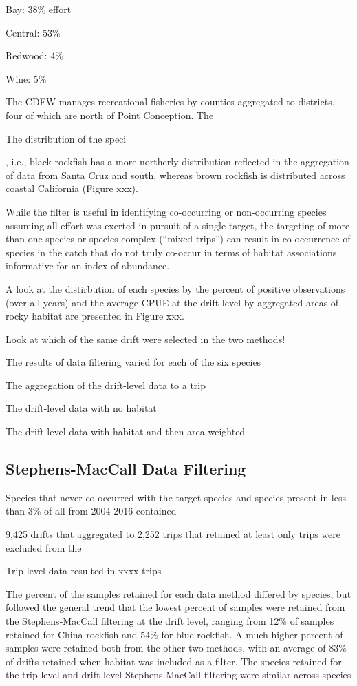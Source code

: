 \documentclass[
  authoryear,
  preprint,
  3p]{elsarticle}
\begin{document}
Bay: 38\% effort

Central: 53\%

Redwood: 4\%

Wine: 5\%

The CDFW manages recreational fisheries by counties aggregated to
districts, four of which are north of Point Conception. The

The distribution of the speci

, i.e., black rockfish has a more northerly distribution reflected in
the aggregation of data from Santa Cruz and south, whereas brown
rockfish is distributed across coastal California (Figure xxx).

While the filter is useful in identifying co-occurring or non-occurring
species assuming all effort was exerted in pursuit of a single target,
the targeting of more than one species or species complex (``mixed
trips'') can result in co-occurrence of species in the catch that do not
truly co-occur in terms of habitat associations informative for an index
of abundance.

A look at the distirbution of each species by the percent of positive
observations (over all years) and the average CPUE at the drift-level by
aggregated areas of rocky habitat are presented in Figure xxx.

Look at which of the same drift were selected in the two methods!

The results of data filtering varied for each of the six species

The aggregation of the drift-level data to a trip

The drift-level data with no habitat

The drift-level data with habitat and then area-weighted

\hypertarget{stephens-maccall-data-filtering-1}{%
\subsection{Stephens-MacCall Data
Filtering}\label{stephens-maccall-data-filtering-1}}

Species that never co-occurred with the target species and species
present in less than 3\% of all from 2004-2016 contained

9,425 drifts that aggregated to 2,252 trips that retained at least only
trips were excluded from the

Trip level data resulted in xxxx trips

The percent of the samples retained for each data method differed by
species, but followed the general trend that the lowest percent of
samples were retained from the Stephens-MacCall filtering at the drift
level, ranging from 12\% of samples retained for China rockfish and 54\%
for blue rockfish. A much higher percent of samples were retained both
from the other two methods, with an average of 83\% of drifts retained
when habitat was included as a filter. The species retained for the
trip-level and drift-level Stephens-MacCall filtering were similar
across species
\end{document}
